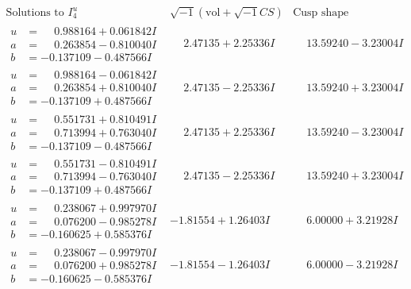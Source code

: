 \documentclass[1p]{elsarticle_modified}
\theoremstyle{definition}
\newcommand{\I}{\sqrt{-1}}
\begin{document}
$$\begin{array}{c|c|c}  
\text{Solutions to }I^u_{4}& \I (\text{vol} + \sqrt{-1}CS) & \text{Cusp shape}\\
 \hline 
\begin{aligned}
u &= \phantom{-}0.988164 + 0.061842 I \\
a &= \phantom{-}0.263854 - 0.810040 I \\
b &= -0.137109 - 0.487566 I\end{aligned}
 & \phantom{-}2.47135 + 2.25336 I & \phantom{-}13.59240 - 3.23004 I \\ \hline\begin{aligned}
u &= \phantom{-}0.988164 - 0.061842 I \\
a &= \phantom{-}0.263854 + 0.810040 I \\
b &= -0.137109 + 0.487566 I\end{aligned}
 & \phantom{-}2.47135 - 2.25336 I & \phantom{-}13.59240 + 3.23004 I \\ \hline\begin{aligned}
u &= \phantom{-}0.551731 + 0.810491 I \\
a &= \phantom{-}0.713994 + 0.763040 I \\
b &= -0.137109 - 0.487566 I\end{aligned}
 & \phantom{-}2.47135 + 2.25336 I & \phantom{-}13.59240 - 3.23004 I \\ \hline\begin{aligned}
u &= \phantom{-}0.551731 - 0.810491 I \\
a &= \phantom{-}0.713994 - 0.763040 I \\
b &= -0.137109 + 0.487566 I\end{aligned}
 & \phantom{-}2.47135 - 2.25336 I & \phantom{-}13.59240 + 3.23004 I \\ \hline\begin{aligned}
u &= \phantom{-}0.238067 + 0.997970 I \\
a &= \phantom{-}0.076200 - 0.985278 I \\
b &= -0.160625 + 0.585376 I\end{aligned}
 & -1.81554 + 1.26403 I & \phantom{-}6.00000 + 3.21928 I \\ \hline\begin{aligned}
u &= \phantom{-}0.238067 - 0.997970 I \\
a &= \phantom{-}0.076200 + 0.985278 I \\
b &= -0.160625 - 0.585376 I\end{aligned}
 & -1.81554 - 1.26403 I & \phantom{-}6.00000 - 3.21928 I \\ \hline\begin{aligned}

\end{aligned}
\end{array}$$
\end{document}
